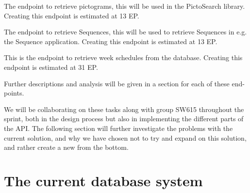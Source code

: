 \begin{description}[style=unboxed]
	\item [Endpoint for Pictograms] The endpoint to retrieve pictograms, this will be used in the PictoSearch library.
	Creating this endpoint is estimated at 13 EP.
	\item [Endpoint for Sequences] The endpoint to retrieve Sequences, this will be used to retrieve Sequences in e.g. the Sequence application.
	Creating this endpoint is estimated at 13 EP.
	\item [Endpoint for Week Schedules] This is the endpoint to retrieve week schedules from the database.
	Creating this endpoint is estimated at 31 EP.
\end{description}
Further descriptions and analysis will be given in a section for each of these end-points.

We will be collaborating on these tasks along with group SW615 throughout the sprint, both in the design process but also in implementing the different parts of the API.
The following section will further investigate the problems with the current solution, and why we have chosen not to try and expand on this solution, and rather create a new from the bottom.

\section{The current database system}
%
%
